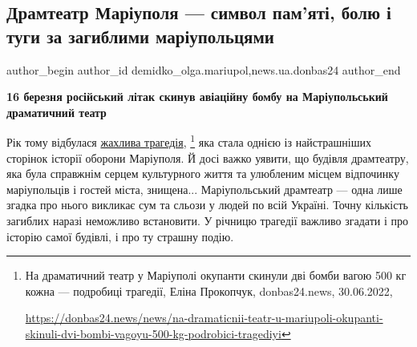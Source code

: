  
 
 
 
 
 
\subsection{Драмтеатр Маріуполя — символ пам'яті, болю і туги за загиблими маріупольцями}
\label{sec:16_03_2023.stz.news.ua.donbas24.1.dramteatr_mrpl_simvol_pamjati_bolu_tugy_za_zagyblymu}
 
\ifcmt
 author_begin
   author_id demidko_olga.mariupol,news.ua.donbas24
 author_end
\fi


\textbf{16 березня російський літак скинув авіаційну бомбу на Маріупольський драматичний театр}

Рік тому відбулася
\href{https://donbas24.news/news/na-dramaticnii-teatr-u-mariupoli-okupanti-skinuli-dvi-bombi-vagoyu-500-kg-podrobici-tragediyi}{жахлива
трагедія},%
\footnote{На драматичний театр у Маріуполі окупанти скинули дві бомби вагою 500 кг кожна — подробиці трагедії, Еліна Прокопчук, %
donbas24.news, 30.06.2022, \par%
\url{https://donbas24.news/news/na-dramaticnii-teatr-u-mariupoli-okupanti-skinuli-dvi-bombi-vagoyu-500-kg-podrobici-tragediyi}}
яка стала однією із найстрашніших сторінок історії оборони Маріуполя. Й досі
важко уявити, що будівля драмтеатру, яка була справжнім серцем культурного
життя та улюбленим місцем відпочинку маріупольців і гостей міста, знищена...
Маріупольський драмтеатр — одна лише згадка про нього викликає сум та сльози у
людей по всій Україні. Точну кількість загиблих наразі неможливо встановити. У
річницю трагедії важливо згадати і про історію самої будівлі, і про ту страшну
подію.

